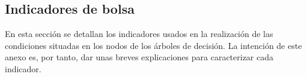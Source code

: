 \begin{appendices}
\chapter{Indicadores de bolsa}
En esta secci\'on se detallan los indicadores usados en la realizaci\'on de las condiciones situadas en los nodos de los \'arboles de decisi\'on. La intenci\'on de este anexo es, por tanto, dar unas breves explicaciones para caracterizar cada indicador.


\end{appendices}

